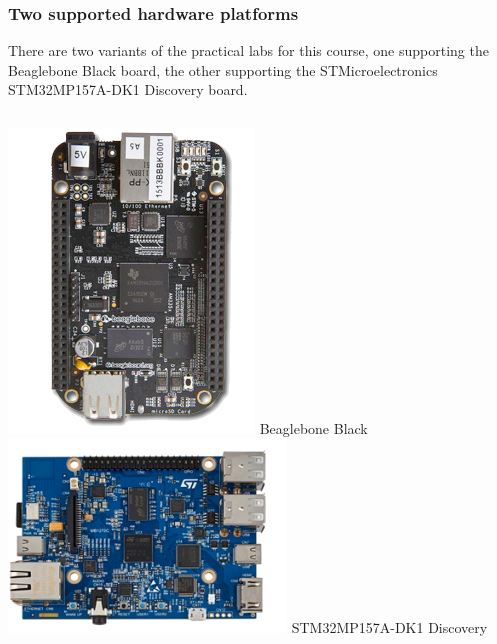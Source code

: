 \begin{frame}
\frametitle{Two supported hardware platforms}
  There are two variants of the practical labs for this course, one
  supporting the Beaglebone Black board, the other supporting the
  STMicroelectronics STM32MP157A-DK1 Discovery board.
  \vfill
  \begin{columns}
    \includegraphics[height=0.5\textheight]{slides/beagleboneblack-board/beagleboneblack.png}
    \newline
    Beaglebone Black
    \includegraphics[height=0.5\textheight]{slides/discovery-board-dk1/discovery-board-dk1.png}
    \newline
    STM32MP157A-DK1 Discovery
  \end{columns}
\end{frame}

